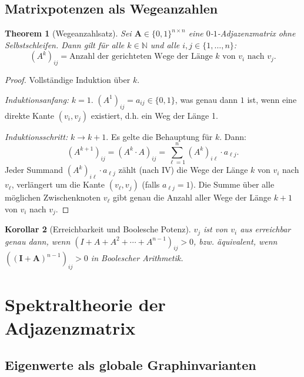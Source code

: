 ﻿\documentclass[12pt, a4paper]{article}
\newtheorem{theorem}{Theorem}[section]
\newtheorem{corollary}[theorem]{Korollar}
\theoremstyle{definition}
\theoremstyle{remark}
\newcommand{\N}{\mathbb{N}}
\newcommand{\vA}{\bm{A}}
\newcommand{\vI}{\bm{I}}
\begin{document}
\subsection{Matrixpotenzen als Wegeanzahlen}
\label{subsec:potenzen}

\begin{theorem}[Wegeanzahlsatz]
\label{thm:wege}
Sei $\vA \in \{0,1\}^{n \times n}$ eine $0$-$1$-Adjazenzmatrix ohne
Selbstschleifen. Dann gilt für alle $k \in \N$ und alle $i,j \in
\{1,\ldots,n\}$:
\[
  (A^k)_{ij} = \text{Anzahl der gerichteten Wege der Länge } k
  \text{ von } v_i \text{ nach } v_j.
\]
\end{theorem}

\begin{proof}
Vollständige Induktion über $k$.

\emph{Induktionsanfang:} $k=1$. $(A^1)_{ij} = a_{ij} \in \{0,1\}$, was
genau dann $1$ ist, wenn eine direkte Kante $(v_i, v_j)$ existiert, d.h.
ein Weg der Länge 1.

\emph{Induktionsschritt:} $k \to k+1$. Es gelte die Behauptung für $k$.
Dann:
\[
  (A^{k+1})_{ij} = (A^k \cdot A)_{ij} = \sum_{\ell=1}^n (A^k)_{i\ell} \cdot a_{\ell j}.
\]
Jeder Summand $(A^k)_{i\ell} \cdot a_{\ell j}$ zählt (nach IV) die Wege
der Länge $k$ von $v_i$ nach $v_\ell$, verlängert um die Kante
$(v_\ell, v_j)$ (falls $a_{\ell j} = 1$). Die Summe über alle möglichen
Zwischenknoten $v_\ell$ gibt genau die Anzahl aller Wege der Länge $k+1$
von $v_i$ nach $v_j$.
\end{proof}

\begin{corollary}[Erreichbarkeit und Boolesche Potenz]
\label{cor:erreich}
$v_j$ ist von $v_i$ aus erreichbar genau dann, wenn
$(I + A + A^2 + \cdots + A^{n-1})_{ij} > 0$,
bzw. äquivalent, wenn $((\vI + \vA)^{n-1})_{ij} > 0$ in Boolescher Arithmetik.
\end{corollary}

\section{Spektraltheorie der Adjazenzmatrix}
\label{sec:spektral}

\subsection{Eigenwerte als globale Graphinvarianten}
\label{subsec:eigenwerte}
\end{document}
